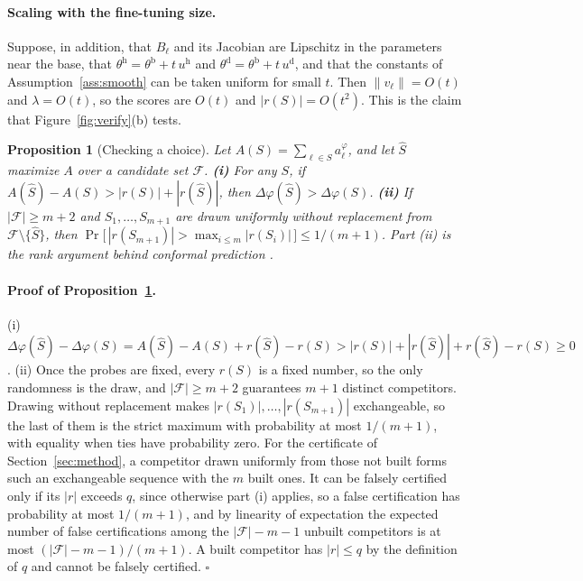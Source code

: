 \documentclass{article}
\theoremstyle{plain}
\newtheorem{proposition}[theorem]{Proposition}
\theoremstyle{definition}
\theoremstyle{remark}
\newcommand{\host}{\mathrm{h}}
\newcommand{\donor}{\mathrm{d}}
\newcommand{\base}{\mathrm{b}}
\begin{document}
\paragraph{Scaling with the fine-tuning size.}
Suppose, in addition, that $B_\ell$ and its Jacobian are Lipschitz in the
parameters near the base, that $\theta^{\host}=\theta^{\base}+t\,u^{\host}$ and
$\theta^{\donor}=\theta^{\base}+t\,u^{\donor}$, and that the constants of
Assumption~\ref{ass:smooth} can be taken uniform for small $t$. Then
$\|v_\ell\|=O(t)$ and $\lambda=O(t)$, so the scores are $O(t)$ and
$|r(S)|=O(t^2)$. This is the claim that Figure~\ref{fig:verify}(b) tests.

\begin{proposition}[Checking a choice]
\label{prop:regret}
Let $A(S)=\sum_{\ell\in S}a^{\varphi}_\ell$, and let $\widehat{S}$ maximize $A$
over a candidate set $\mathcal{F}$.
\textbf{(i)} For any $S$, if $A(\widehat{S})-A(S)>|r(S)|+|r(\widehat{S})|$, then
$\Delta\varphi(\widehat{S})>\Delta\varphi(S)$.
\textbf{(ii)} If $|\mathcal{F}|\ge m+2$ and $S_1,\dots,S_{m+1}$ are drawn
uniformly without replacement from $\mathcal{F}\setminus\{\widehat{S}\}$, then
$\Pr\big[\,|r(S_{m+1})|>\max_{i\le m}|r(S_i)|\,\big]\le 1/(m+1)$. Part (ii) is
the rank argument behind conformal prediction \citep{vovk2005,
angelopoulos2023gentle}.
\end{proposition}

\paragraph{Proof of Proposition~\ref{prop:regret}.}
(i) $\Delta\varphi(\widehat S)-\Delta\varphi(S)=A(\widehat S)-A(S)+r(\widehat S)-r(S)
>|r(S)|+|r(\widehat S)|+r(\widehat S)-r(S)\ge0$.
(ii) Once the probes are fixed, every $r(S)$ is a fixed number, so the only
randomness is the draw, and $|\mathcal{F}|\ge m+2$ guarantees $m+1$ distinct
competitors. Drawing without replacement makes
$|r(S_1)|,\dots,|r(S_{m+1})|$ exchangeable, so the last of them is the strict
maximum with probability at most $1/(m+1)$, with equality when ties have
probability zero. For the certificate of Section~\ref{sec:method}, a competitor
drawn uniformly from those not built forms such an exchangeable sequence with the
$m$ built ones. It can be falsely certified only if its $|r|$ exceeds $q$, since
otherwise part (i) applies, so a false certification has probability at most
$1/(m+1)$, and by linearity of expectation the expected number of false
certifications among the $|\mathcal{F}|-m-1$ unbuilt competitors is at most
$(|\mathcal{F}|-m-1)/(m+1)$. A built competitor has $|r|\le q$ by the definition
of $q$ and cannot be falsely certified. \hfill$\square$
\end{document}

